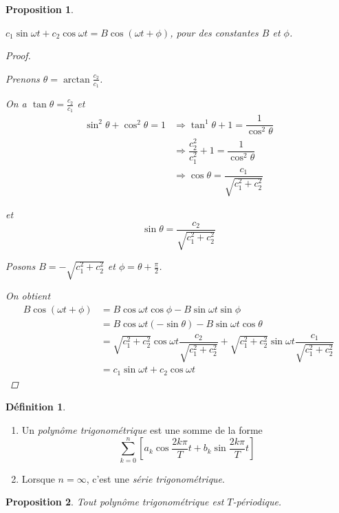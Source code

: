 \documentclass{report}
\newcommand*{\dsum}[4]{\displaystyle\sum_{#1=#2}^{#3}#4}
\newtheorem*{prop}{Proposition}
\theoremstyle{definition}
\newtheorem*{defin}{D\'efinition}
\theoremstyle{remark}
\begin{document}
	\begin{prop}~

		$c_1\sin\omega t+c_2\cos\omega t = B\cos(\omega t+\phi)$, pour des constantes $B$ et $\phi$.
		\begin{proof}~

			Prenons $\theta = \arctan\frac{c_2}{c_1}$.

			On a $\tan\theta = \frac{c_2}{c_1}$ et
			\begin{align*}
				\sin^2\theta + \cos^2\theta = 1 &\Rightarrow \tan^1\theta + 1 = \dfrac{1}{\cos^2\theta}\\
				&\Rightarrow \dfrac{c_2^2}{c_1^2} + 1 = \dfrac{1}{\cos^2\theta}\\
				&\Rightarrow \cos\theta = \dfrac{c_1}{\sqrt{c_1^2+c_2^2}}
			\end{align*}

			et
			\begin{equation*}
				\sin\theta = \dfrac{c_2}{\sqrt{c_1^2+c_2^2}}
			\end{equation*}

			Posons $B=-\sqrt{c_1^2+c_2^2}$ et $\phi = \theta+\frac{\pi}{2}$.

			On obtient
			\begin{align*}
				B\cos(\omega t+\phi)&= B\cos\omega t\cos\phi - B\sin\omega t\sin\phi\\
				&= B\cos\omega t(-\sin\theta) - B\sin\omega t\cos\theta\\
				&= \sqrt{c_1^2+c_2^2}\cos\omega t\dfrac{c_2}{\sqrt{c_1^2+c_2^2}} + \sqrt{c_1^2+c_2^2}\sin\omega t\dfrac{c_1}{\sqrt{c_1^2+c_2^2}}\\
				&= c_1\sin\omega t+c_2\cos\omega t
			\end{align*}
		\end{proof}
	\end{prop}
	\begin{defin}~

		\begin{enumerate}[label=\alph*)]
			\item Un \emph{polyn\^ome trigonom\'etrique} est une somme de la forme
			\begin{equation*}
				\dsum{k}{0}{n}{\left[ a_k\cos\dfrac{2k\pi}{T}t + b_k\sin\dfrac{2k\pi}{T}t \right]}
			\end{equation*}
			\item Lorsque $n=\infty$, c'est une \emph{s\'erie trigonom\'etrique}.
		\end{enumerate}
	\end{defin}
	\begin{prop}
		Tout polyn\^ome trigonom\'etrique est $T$-p\'eriodique.
	\end{prop}
\end{document}
